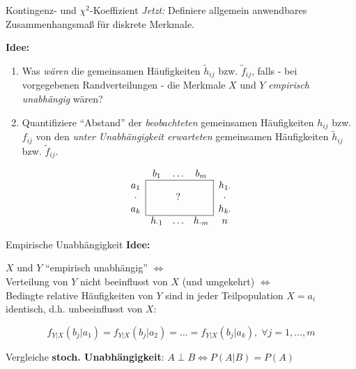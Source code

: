 \documentclass[
  10pt,
  ignorenonframetext,
]{beamer}
\begin{document}
\begin{frame}{Kontingenz- und \(\chi^2\)-Koeffizient}
\protect\hypertarget{kontingenz--und-chi2-koeffizient}{}
\emph{Jetzt:} Definiere allgemein anwendbares Zusammenhangsmaß für
diskrete Merkmale.

\textbf{Idee:}

\begin{enumerate}
\item
  Was \emph{wären} die gemeinsamen Häufigkeiten \(\tilde{h}_{ij}\) bzw.
  \(\tilde{f}_{ij}\), falls - bei vorgegebenen Randverteilungen - die
  Merkmale \(X\) und \(Y\) \emph{empirisch unabhängig} wären?
\item
  Quantifiziere ``Abstand'' der \emph{beobachteten} gemeinsamen
  Häufigkeiten \(h_{ij}\) bzw. \(f_{ij}\) von den \emph{unter
  Unabhängigkeit erwarteten} gemeinsamen Häufigkeiten \(\tilde{h}_{ij}\)
  bzw. \(\tilde{f}_{ij}\).
\end{enumerate}

\vspace*{0.5cm}

\begin{displaymath}
\begin{array}{c|ccc|c}
\multicolumn{1}{c}{}
& \multicolumn{1}{c}{b_1}
  & \dots
    & \multicolumn{1}{c}{b_m}\\\cline{2-4}
a_1    &  &   &  & h_{1\cdot}\\
\cdot &  & ? &  & \cdot \\
a_k    &  &   &  & h_{k\cdot}\\\cline{2-4}
\multicolumn{1}{c}{}
  & \multicolumn{1}{c}{h_{\cdot 1} }
    & \dots
      & \multicolumn{1}{c}{h_{\cdot m} }
        & \multicolumn{1}{c}{n}
\end{array}
\end{displaymath}
\end{frame}

\begin{frame}{Empirische Unabhängigkeit}
\protect\hypertarget{empirische-unabhuxe4ngigkeit}{}
\textbf{Idee:}

\(X\) und \(Y\) ``empirisch unabhängig'' \(\iff\)\\
Verteilung von \(Y\) nicht beeinflusst von \(X\) (und umgekehrt)
\(\iff\)\\
Bedingte relative Häufigkeiten von \(Y\) sind in jeder Teilpopulation
\(X = a_i\) identisch, d.h. unbeeinflusst von \(X\):

\[f_{Y|X}(b_j|a_1) = f_{Y|X}(b_j|a_2) = \ldots = f_{Y|X}(b_j|a_k), \;\forall j = 1,\ldots,m\]

Vergleiche \textbf{stoch. Unabhängigkeit}:
\(A \perp B \iff P(A|B)= P(A)\)
\end{frame}
\end{document}
